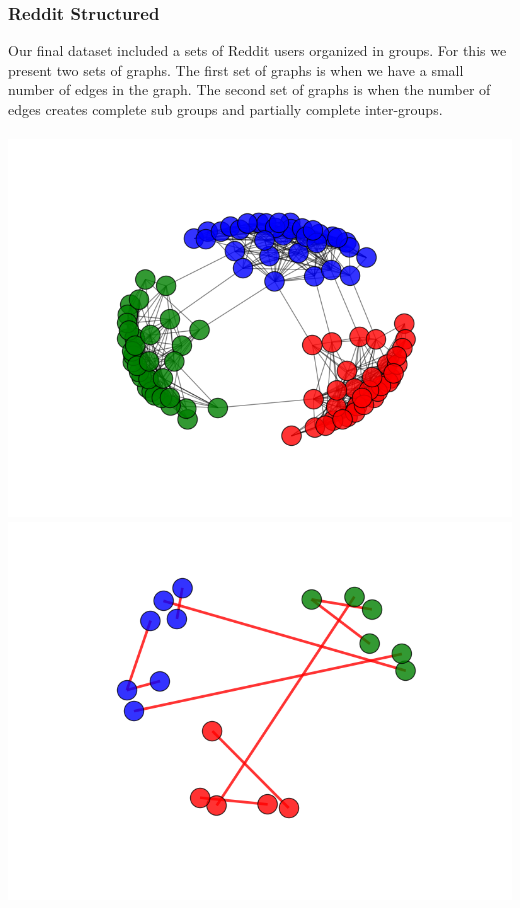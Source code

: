 \documentclass{article}
\begin{document}
\subsubsection{Reddit Structured}
Our final dataset included a sets of Reddit users organized in groups. For this we present two sets of graphs. The first set of graphs is when we have a small number of edges in the graph. The second set of graphs is when the number of edges creates complete sub groups and partially complete inter-groups.
\\\\
\includegraphics[scale=0.4]{imgs/reddit_small/original.png}
\includegraphics[scale=0.4]{imgs/reddit_small/hard.png}
\\\\
\end{document}
